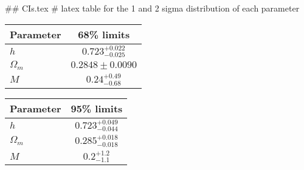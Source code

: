 ## CIs.tex
# latex table for the 1 and 2 sigma distribution of each parameter

\begin{tabular} { l  c}
 Parameter &  68\% limits\\
\hline
{\boldmath$h              $} & $0.723^{+0.022}_{-0.025}   $\\
{\boldmath$\Omega_m       $} & $0.2848\pm 0.0090          $\\
{\boldmath$M              $} & $0.24^{+0.49}_{-0.68}      $\\
\hline
\end{tabular}

\begin{tabular} { l  c}
 Parameter &  95\% limits\\
\hline
{\boldmath$h              $} & $0.723^{+0.049}_{-0.044}   $\\
{\boldmath$\Omega_m       $} & $0.285^{+0.018}_{-0.018}   $\\
{\boldmath$M              $} & $0.2^{+1.2}_{-1.1}         $\\
\hline
\end{tabular}
